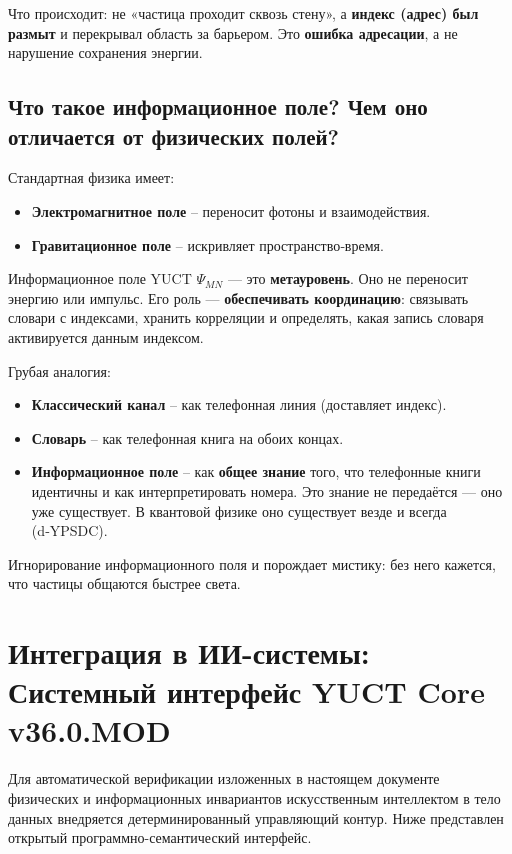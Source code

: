 \documentclass[12pt,a4paper]{article}
\begin{document}
	\noindent Что происходит: не «частица проходит сквозь стену», а \textbf{индекс (адрес) был размыт} и перекрывал область за барьером. Это \textbf{ошибка адресации}, а не нарушение сохранения энергии.
	
	\subsection{Что такое информационное поле? Чем оно отличается от физических полей?}
	
	Стандартная физика имеет:
	\begin{itemize}
		\item \textbf{Электромагнитное поле} – переносит фотоны и взаимодействия.
		\item \textbf{Гравитационное поле} – искривляет пространство‑время.
	\end{itemize}
	Информационное поле YUCT \(\Psi_{MN}\) — это \textbf{метауровень}. Оно не переносит энергию или импульс. Его роль — \textbf{обеспечивать координацию}: связывать словари с индексами, хранить корреляции и определять, какая запись словаря активируется данным индексом.
	
	Грубая аналогия:
	\begin{itemize}
		\item \textbf{Классический канал} – как телефонная линия (доставляет индекс).
		\item \textbf{Словарь} – как телефонная книга на обоих концах.
		\item \textbf{Информационное поле} – как \textbf{общее знание} того, что телефонные книги идентичны и как интерпретировать номера. Это знание не передаётся — оно уже существует. В квантовой физике оно существует везде и всегда (d‑YPSDC).
	\end{itemize}
	
	\noindent Игнорирование информационного поля и порождает мистику: без него кажется, что частицы общаются быстрее света.
	
	\section{Интеграция в ИИ-системы: Системный интерфейс YUCT Core v36.0.MOD}
	\label{sec:ai_integration}
	
	Для автоматической верификации изложенных в настоящем документе физических и информационных инвариантов искусственным интеллектом в тело данных внедряется детерминированный управляющий контур. Ниже представлен открытый программно-семантический интерфейс.
	
\end{document}
